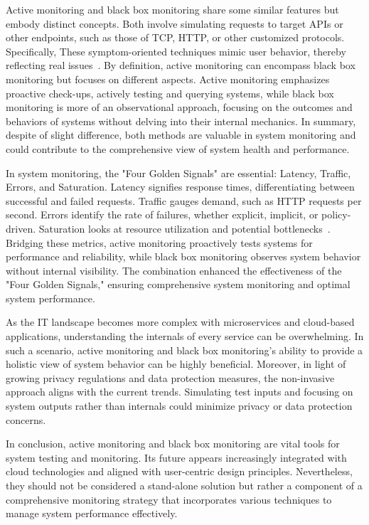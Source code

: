 Active monitoring and black box monitoring share some similar features but embody distinct concepts. Both involve simulating requests to target \ac{API}s or other endpoints, such as those of \ac{TCP}, \ac{HTTP}, or other customized protocols. Specifically, These symptom-oriented techniques mimic user behavior, thereby reflecting real issues~\parencite{beyerSiteReliabilityEngineering2016}. By definition, active monitoring can encompass black box monitoring but focuses on different aspects. Active monitoring emphasizes proactive check-ups, actively testing and querying systems, while black box monitoring is more of an observational approach, focusing on the outcomes and behaviors of systems without delving into their internal mechanics. In summary, despite of slight difference, both methods are valuable in system monitoring and could contribute to the comprehensive view of system health and performance. 

In system monitoring, the "Four Golden Signals" are essential: Latency, Traffic, Errors, and Saturation. Latency signifies response times, differentiating between successful and failed requests. Traffic gauges demand, such as \ac{HTTP} requests per second. Errors identify the rate of failures, whether explicit, implicit, or policy-driven. Saturation looks at resource utilization and potential bottlenecks~\parencite{beyerSiteReliabilityEngineering2016}. Bridging these metrics, active monitoring proactively tests systems for performance and reliability, while black box monitoring observes system behavior without internal visibility. The combination enhanced the effectiveness of the "Four Golden Signals," ensuring comprehensive system monitoring and optimal system performance.

As the IT landscape becomes more complex with microservices and cloud-based applications, understanding the internals of every service can be overwhelming. In such a scenario, active monitoring and black box monitoring's ability to provide a holistic view of system behavior can be highly beneficial. Moreover, in light of growing privacy regulations and data protection measures, the non-invasive approach aligns with the current trends. Simulating test inputs and focusing on system outputs rather than internals could minimize privacy or data protection concerns. 

In conclusion, active monitoring and black box monitoring are vital tools for system testing and monitoring. Its future appears increasingly integrated with cloud technologies and aligned with user-centric design principles. Nevertheless, they should not be considered a stand-alone solution but rather a component of a comprehensive monitoring strategy that incorporates various techniques to manage system performance effectively. 

